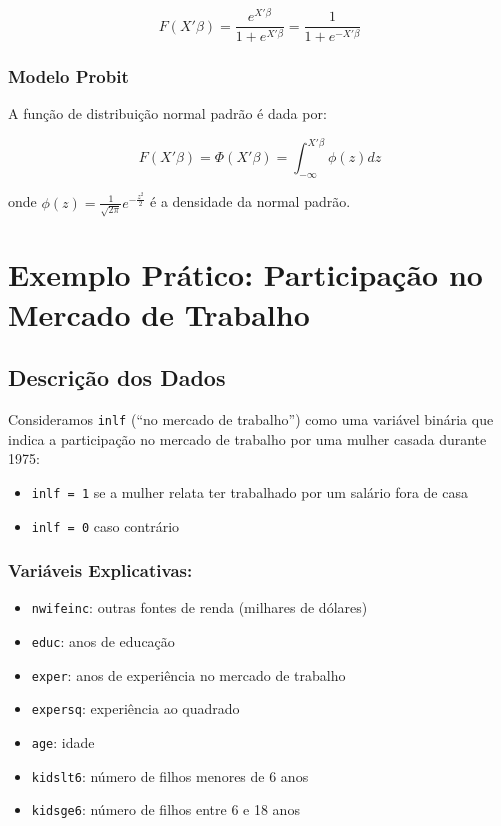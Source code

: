\documentclass[
  letterpaper,
  DIV=11,
  numbers=noendperiod]{scrartcl}
\providecommand{\tightlist}{%
  \setlength{\itemsep}{0pt}\setlength{\parskip}{0pt}}\usepackage{longtable,booktabs,array}
\begin{document}
\[F(X'\beta) = \frac{e^{X'\beta}}{1 + e^{X'\beta}} = \frac{1}{1 + e^{-X'\beta}}\]

\subsubsection{Modelo Probit}\label{modelo-probit}

A função de distribuição normal padrão é dada por:

\[F(X'\beta) = \Phi(X'\beta) = \int_{-\infty}^{X'\beta} \phi(z)dz\]

onde \(\phi(z) = \frac{1}{\sqrt{2\pi}}e^{-\frac{z^2}{2}}\) é a densidade
da normal padrão.

\section{Exemplo Prático: Participação no Mercado de
Trabalho}\label{exemplo-pruxe1tico-participauxe7uxe3o-no-mercado-de-trabalho}

\subsection{Descrição dos Dados}\label{descriuxe7uxe3o-dos-dados}

Consideramos \texttt{inlf} (``no mercado de trabalho'') como uma
variável binária que indica a participação no mercado de trabalho por
uma mulher casada durante 1975:

\begin{itemize}
\tightlist
\item
  \texttt{inlf\ =\ 1} se a mulher relata ter trabalhado por um salário
  fora de casa
\item
  \texttt{inlf\ =\ 0} caso contrário
\end{itemize}

\subsubsection{Variáveis Explicativas:}\label{variuxe1veis-explicativas}

\begin{itemize}
\tightlist
\item
  \texttt{nwifeinc}: outras fontes de renda (milhares de dólares)
\item
  \texttt{educ}: anos de educação
\item
  \texttt{exper}: anos de experiência no mercado de trabalho
\item
  \texttt{expersq}: experiência ao quadrado
\item
  \texttt{age}: idade
\item
  \texttt{kidslt6}: número de filhos menores de 6 anos
\item
  \texttt{kidsge6}: número de filhos entre 6 e 18 anos
\end{itemize}
\end{document}
